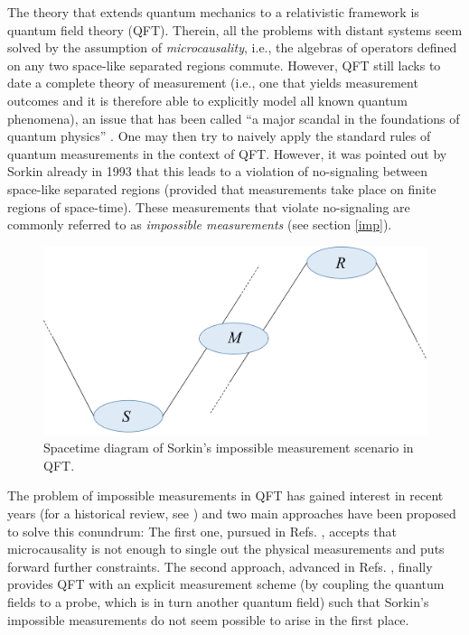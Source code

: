 \documentclass[12pt]{article}
\begin{document}
The theory that extends quantum mechanics to a relativistic framework is quantum field theory (QFT). Therein, all the problems with distant systems seem solved by the assumption of \textit{microcausality}, i.e., the algebras of operators defined on any two space-like separated regions commute. However, QFT still lacks to date a complete theory of measurement (i.e., one that yields measurement outcomes and it is therefore able to explicitly model all known quantum phenomena), an issue that has been called “a major scandal in the foundations of quantum physics” \cite{earman}. One may then try to naively apply the  standard rules of quantum measurements in the context of QFT. However, it was pointed out by Sorkin  already in 1993 \cite{sorkin1993impossible} that this leads to a violation of no-signaling between space-like separated regions (provided that measurements take place on finite regions of space-time). These measurements that violate no-signaling are commonly referred to as \textit{impossible measurements} (see section \ref{imp}). 
\begin{figure}[ht]
    \centering
    \includegraphics[width=.48\textwidth]{sorkin.png}
    \caption{Spacetime diagram of Sorkin's impossible measurement scenario in QFT.}
    \label{fig1}
\end{figure}

The problem of impossible measurements in QFT has gained interest in recent years (for a historical review, see \cite{fraser2023note, papageorgiou2023eliminating}) and two main approaches have been proposed to solve this conundrum: The first one, pursued in Refs. \cite{borsten2021impossible, jubb2022causal, albertini2023ideal}, accepts that microcausality is not enough to single out the physical measurements and puts forward further constraints. The second approach, advanced in Refs. \cite{fewster2020quantum, fewster2020generally, bostelmann2021impossible, fewster2023measurement}, finally provides  QFT with an explicit measurement scheme (by coupling the quantum fields to a probe, which is in turn another quantum field) such that Sorkin's impossible measurements do not seem possible to arise in the first place. 
\end{document}
